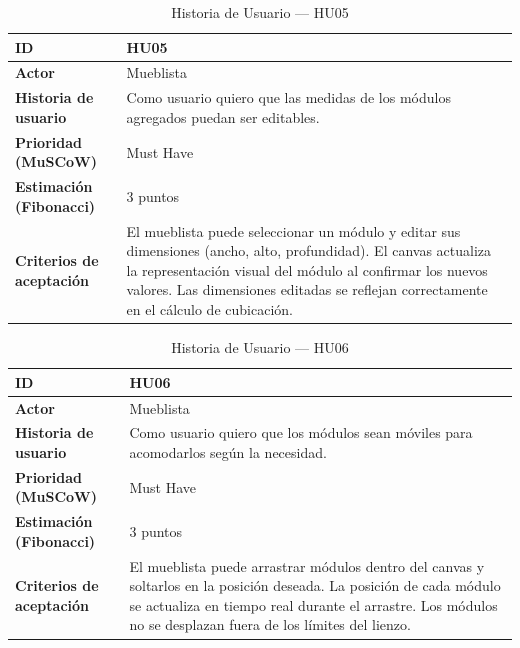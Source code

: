 ﻿\documentclass{iccmemoria}
\begin{document}
\begin{table}[H]
\centering
\caption{Historia de Usuario — HU05}
\begin{tabular}{|p{4.5cm}|p{9.5cm}|}
\hline
\textbf{ID} & HU05 \\
\hline
\textbf{Actor} & Mueblista \\
\hline
\textbf{Historia de usuario} & Como usuario quiero que las medidas de los módulos agregados puedan ser editables. \\
\hline
\textbf{Prioridad (MuSCoW)} & Must Have \\
\hline
\textbf{Estimación (Fibonacci)} & 3 puntos \\
\hline
\textbf{Criterios de aceptación} & El mueblista puede seleccionar un módulo y editar sus dimensiones (ancho, alto, profundidad).\newline
El canvas actualiza la representación visual del módulo al confirmar los nuevos valores.\newline
Las dimensiones editadas se reflejan correctamente en el cálculo de cubicación. \\
\hline
\end{tabular}
\end{table}

\begin{table}[H]
\centering
\caption{Historia de Usuario — HU06}
\begin{tabular}{|p{4.5cm}|p{9.5cm}|}
\hline
\textbf{ID} & HU06 \\
\hline
\textbf{Actor} & Mueblista \\
\hline
\textbf{Historia de usuario} & Como usuario quiero que los módulos sean móviles para acomodarlos según la necesidad. \\
\hline
\textbf{Prioridad (MuSCoW)} & Must Have \\
\hline
\textbf{Estimación (Fibonacci)} & 3 puntos \\
\hline
\textbf{Criterios de aceptación} & El mueblista puede arrastrar módulos dentro del canvas y soltarlos en la posición deseada.\newline
La posición de cada módulo se actualiza en tiempo real durante el arrastre.\newline
Los módulos no se desplazan fuera de los límites del lienzo. \\
\hline
\end{tabular}
\end{table}
\end{document}
